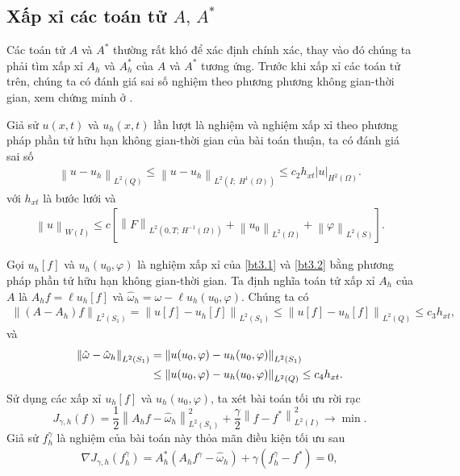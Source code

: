 \documentclass[]{article}
\begin{document}
\subsection*{Xấp xỉ  các toán tử $A,\, A^*$}
\qquad Các toán tử $A$ và $A^*$ thường rất khó để xác định chính xác, thay vào đó chúng ta phải tìm xấp xỉ $A_h$ và $A^*_h$ của $A$ và $A^*$ tương ứng. Trước khi xấp xỉ các toán tử trên, chúng ta có đánh giá sai số nghiệm theo phương phương không gian-thời gian, xem chứng minh ở \cite{a5}.
\begin{dl}\label{dl3.2}
	Giả sử $u(x, t)$ và $u_h(x, t)$ lần lượt là nghiệm và nghiệm xấp xỉ theo phương pháp phần tử hữu hạn không gian-thời gian của bài toán thuận, ta có đánh giá sai số
	\begin{align}\label{3.9}
		\left\| u-u_h\right\|_{L^2(Q)}\leq \left\| u-u_h\right\|_{L^2(I;\; H^1(\Omega))}\leq c_2h_{xt} \left|u\right|_{H^2(\Omega)}.
	\end{align}
	với $h_{xt}$ là bước lưới và
	\begin{align}\label{them}
		\left\|u \right\|_{W(I)}\leq c\left[\left\| F\right\|_{L^2(0, T;\, H^{-1}(\Omega))}+\left\|u_0 \right\|_{L^2(\Omega)}+\left\| \varphi\right\|_{L^2(S)}\right].
	\end{align}
\end{dl}
\noindent Gọi $u_h[f]$ và $u_h(u_0, \varphi)$ là nghiệm xấp xỉ của \cref{bt3.1} và \cref{bt3.2} bằng phương pháp phần tử hữu hạn không gian-thời gian. Ta định nghĩa toán tử xấp xỉ $A_h$ của $A$ là $A_hf=\ell u_h[f]$ và $\hat{\omega}_h=\omega-\ell u_h(u_0, \varphi)$. Chúng ta có
\begin{align}\label{3.11}
	\left\| \left(A-A_h\right)f\right\|_{L^2(S_1)}=\left\| u[f]-u_h[f]\right\|_{L^2(S_1)}\leq \left\| u[f]-u_h[f]\right\|_{L^2(Q)}\leq c_3h_{xt},
\end{align}
và 
\begin{align}
	\left\| \hat{\omega}-\hat{\omega}_h\right\|_{L^2(S_1)}&=\left\| u(u_0,\varphi)-u_h(u_0, \varphi)\right\|_{L^2(S_1)}\notag\\
	&\leq \left\| u(u_0,\varphi)-u_h(u_0, \varphi)\right\|_{L^2(Q)}\leq c_4h_{xt}\label{3.12}.
\end{align}
Sử dụng các xấp xỉ $u_h[f]$ và $u_h(u_0, \varphi)$, ta xét bài toán tối ưu rời rạc
$$J_{\gamma, h}(f)=\frac{1}{2}\left\|A_hf-\hat{\omega}_h\right\|^2_{L^2(S_1)}+\frac{\gamma}{2}\left\|f-f^*\right\|^2_{L^2(I)}\to \min.$$
Giả sử $f^\gamma_h$ là nghiệm của bài toán này thỏa mãn điều kiện tối ưu sau
\begin{align}\label{3.13}
	\nabla J_{\gamma, h}(f^\gamma_h)= A_h^*(A_hf^\gamma-\hat{\omega}_h)+\gamma(f^\gamma_h-f^*)=0,
\end{align}
\end{document}
